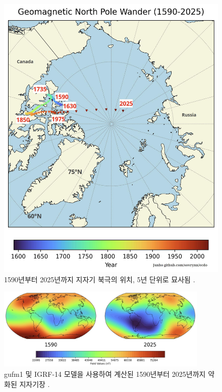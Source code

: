 \documentclass[10pt,twocolumn,letterpaper]{article}
\begin{document}
\begin{figure}[t]
\begin{center}
   \includegraphics[width=1\linewidth]{npw.jpg}
\end{center}
   \caption{1590년부터 2025년까지 지자기 북극의 위치, 5년 단위로 묘사됨 \cite{142}.}
\label{fig:13}
\label{fig:onecol}
\end{figure}

\begin{figure}[t]
\begin{center}
\includegraphics[width=0.9\textwidth]{saa.jpg}
\end{center}
   \caption{gufm1 및 IGRF-14 모델을 사용하여 계산된 1590년부터 2025년까지 약화된 지자기장 \cite{125,126}.}
\label{fig:14}
\end{figure}
\end{document}
